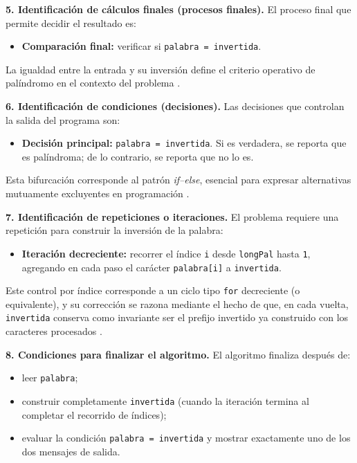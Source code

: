 \documentclass[12pt,twoside]{book}
\begin{document}
						\noindent
						\textbf{5. Identificación de cálculos finales (procesos finales).}
						El proceso final que permite decidir el resultado es:
						
						\begin{itemize}
							\item \textbf{Comparación final:} verificar si \texttt{palabra = invertida}.
						\end{itemize}
						
						\noindent
						La igualdad entre la entrada y su inversión define el criterio operativo de palíndromo en el contexto del problema \cite{Joyanes2007Fundamentos}.
						
						\noindent
						\textbf{6. Identificación de condiciones (decisiones).}
						Las decisiones que controlan la salida del programa son:
						
						\begin{itemize}
							\item \textbf{Decisión principal:} \texttt{palabra = invertida}. Si es verdadera, se reporta que es palíndroma; de lo contrario, se reporta que no lo es.
						\end{itemize}
						
						\noindent
						Esta bifurcación corresponde al patrón \emph{if--else}, esencial para expresar alternativas mutuamente excluyentes en programación \cite{Farrell2018Programming,Gaddis2022Starting}.
						
						\noindent
						\textbf{7. Identificación de repeticiones o iteraciones.}
						El problema requiere una repetición para construir la inversión de la palabra:
						
						\begin{itemize}
							\item \textbf{Iteración decreciente:} recorrer el índice \texttt{i} desde \texttt{longPal} hasta \texttt{1}, agregando en cada paso el carácter \texttt{palabra[i]} a \texttt{invertida}.
						\end{itemize}
						
						\noindent
						Este control por índice corresponde a un ciclo tipo \texttt{for} decreciente (o equivalente), y su corrección se razona mediante el hecho de que, en cada vuelta, \texttt{invertida} conserva como invariante ser el prefijo invertido ya construido con los caracteres procesados \cite{Cormen2022Introduction}.
						
						\noindent
						\textbf{8. Condiciones para finalizar el algoritmo.}
						El algoritmo finaliza después de:
						\begin{itemize}
							\item leer \texttt{palabra};
							\item construir completamente \texttt{invertida} (cuando la iteración termina al completar el recorrido de índices);
							\item evaluar la condición \texttt{palabra = invertida} y mostrar exactamente uno de los dos mensajes de salida.
						\end{itemize}
						
\end{document}
